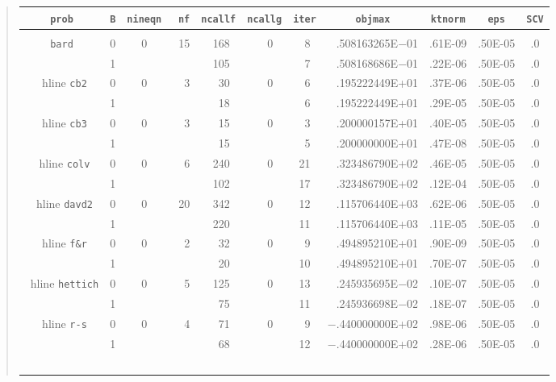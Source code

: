 \newpage
\renewcommand{\baselinestretch}{1.0} %
 \begin{quote}
{\scriptsize
\begin{tabular}{cccccccrllc} \hline
\multicolumn{1}{c}{\tt prob} & 
\multicolumn{1}{c}{{\tt B}} & 
\multicolumn{1}{c}{{\tt nineqn}} & 
\multicolumn{1}{r}{{\tt nf}} & 
\multicolumn{1}{c}{{\tt ncallf}} & 
\multicolumn{1}{c}{{\tt ncallg}} &
\multicolumn{1}{c}{{\tt iter}} &
\multicolumn{1}{c}{{\tt objmax}} & 
\multicolumn{1}{c}{{\tt ktnorm}} &
\multicolumn{1}{c}{{\tt eps}} &
\multicolumn{1}{c}{{\tt SCV}}\\ \hline \\
 {\tt bard} & 0 &0&~15&~168&~~0&~8&   .508163265E$-$01&.61E-09 & .50E-05&.0 \\
            & 1 & &   &~105&   &~7&   .508168686E$-$01&.22E-06 & .50E-05&.0 \\\
hline
 {\tt cb2}  & 0 &0&~~3&~~30&~~0&~6&   .195222449E+01  &.37E-06 & .50E-05&.0 \\
            & 1 & &   &~~18&   &~6&   .195222449E+01  &.29E-05 & .50E-05 &.0\\\
hline
 {\tt cb3}  & 0 &0&~~3&~~15&~~0&~3&   .200000157E+01  &.40E-05 & .50E-05 &.0\\
            & 1 & &   &~~15&   &~5&   .200000000E+01  &.47E-08 & .50E-05 &.0\\\
hline
{\tt colv}  & 0 &0&~~6&~240&~~0&21&   .323486790E+02  &.46E-05 & .50E-05 &.0\\
            & 1 & &   &~102&   &17&   .323486790E+02  &.12E-04 & .50E-05 &.0\\\
hline
{\tt davd2} & 0 &0&~20&~342&~~0&12&   .115706440E+03  &.62E-06 & .50E-05 &.0\\
            & 1 & &   &~220&   &11&   .115706440E+03  &.11E-05 & .50E-05 &.0\\\
hline
{\tt f\&r}  & 0 &0&~~2&~~32&~~0&~9&   .494895210E+01  &.90E-09 & .50E-05 &.0\\
            & 1 & &   &~~20&   &10&   .494895210E+01  &.70E-07 & .50E-05 &.0\\\
hline
{\tt hettich}& 0 &0&~~5&~125&~~0&13&  .245935695E$-$02&.10E-07 & .50E-05&.0 \\
            & 1 & &   &~~75&   &11&   .245936698E$-$02&.18E-07 & .50E-05&.0 \\\
hline
{\tt r-s}   & 0 &0&~~4&~~71&~~0&~9&$-$.440000000E+02  &.98E-06 & .50E-05 &.0\\
            & 1 & &   &~~68&   &12&$-$.440000000E+02  &.28E-06 & .50E-05 &.0\\\

\end{tabular}}
\end{quote}
